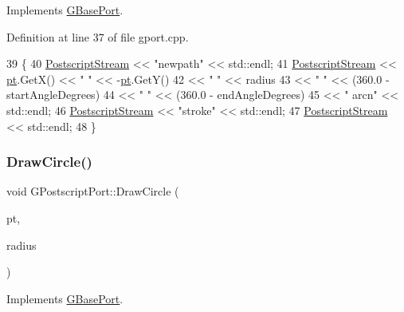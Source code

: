 Implements \mbox{\hyperlink{class_g_base_port_af9375a9f4cd1bc94ac70eb71c437835a}{G\+Base\+Port}}.



Definition at line 37 of file gport.\+cpp.


\begin{DoxyCode}
39 \{
40     \mbox{\hyperlink{class_g_postscript_port_a0fb398f1c65b3ccb0efccd509f60d20d}{PostscriptStream}} << \textcolor{stringliteral}{"newpath"} << std::endl;
41     \mbox{\hyperlink{class_g_postscript_port_a0fb398f1c65b3ccb0efccd509f60d20d}{PostscriptStream}} << \mbox{\hyperlink{rings_8cpp_af69bbacaaf68a115b351c5d1e29c3cc8}{pt}}.GetX() << \textcolor{stringliteral}{" "} << -\mbox{\hyperlink{rings_8cpp_af69bbacaaf68a115b351c5d1e29c3cc8}{pt}}.GetY()
42         << \textcolor{stringliteral}{" "} << radius
43         << \textcolor{stringliteral}{" "} << (360.0 -startAngleDegrees)
44         << \textcolor{stringliteral}{" "} << (360.0 - endAngleDegrees)
45         << \textcolor{stringliteral}{" arcn"}      << std::endl;
46     \mbox{\hyperlink{class_g_postscript_port_a0fb398f1c65b3ccb0efccd509f60d20d}{PostscriptStream}} << \textcolor{stringliteral}{"stroke"}                                        << std::endl;
47     \mbox{\hyperlink{class_g_postscript_port_a0fb398f1c65b3ccb0efccd509f60d20d}{PostscriptStream}} << std::endl;
48 \}
\end{DoxyCode}
\mbox{\label{class_g_postscript_port_a859f59aeb691f0a9072aacc555417bb5}} 
\subsubsection{\texorpdfstring{Draw\+Circle()}{DrawCircle()}}
{\footnotesize\ttfamily void G\+Postscript\+Port\+::\+Draw\+Circle (\begin{DoxyParamCaption}\item[{const \mbox{\hyperlink{class_g_point}{G\+Point}} \&}]{pt,  }\item[{const int}]{radius }\end{DoxyParamCaption})\hspace{0.3cm}{\ttfamily [virtual]}}



Implements \mbox{\hyperlink{class_g_base_port_a7dbdd13c9a8f60537e7915a7991ab0f0}{G\+Base\+Port}}.



